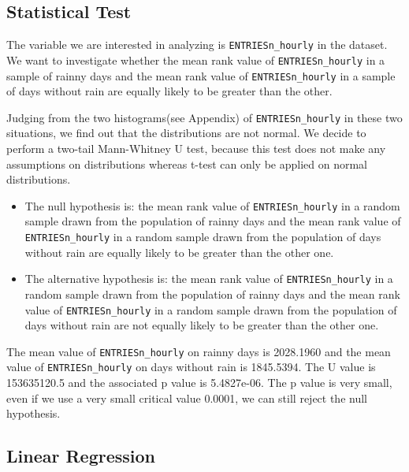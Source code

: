 \documentclass{article}
\begin{document}
    \subsection{Statistical Test}\label{statistical-test}

The variable we are interested in analyzing is \texttt{ENTRIESn\_hourly}
in the dataset. We want to investigate whether the mean rank value of
\texttt{ENTRIESn\_hourly} in a sample of rainny days and the mean rank
value of \texttt{ENTRIESn\_hourly} in a sample of days without rain are
equally likely to be greater than the other.

Judging from the two histograms(see Appendix) of
\texttt{ENTRIESn\_hourly} in these two situations, we find out that the
distributions are not normal. We decide to perform a two-tail
Mann-Whitney U test, because this test does not make any assumptions on
distributions whereas t-test can only be applied on normal
distributions.

\begin{itemize}
\itemsep1pt\parskip0pt
\item
  The null hypothesis is: the mean rank value of
  \texttt{ENTRIESn\_hourly} in a random sample drawn from the population
  of rainny days and the mean rank value of \texttt{ENTRIESn\_hourly} in
  a random sample drawn from the population of days without rain are
  equally likely to be greater than the other one.\\
\item
  The alternative hypothesis is: the mean rank value of
  \texttt{ENTRIESn\_hourly} in a random sample drawn from the population
  of rainny days and the mean rank value of \texttt{ENTRIESn\_hourly} in
  a random sample drawn from the population of days without rain are not
  equally likely to be greater than the other one.
\end{itemize}

The mean value of \texttt{ENTRIESn\_hourly} on rainny days is 2028.1960
and the mean value of \texttt{ENTRIESn\_hourly} on days without rain is
1845.5394. The U value is 153635120.5 and the associated p value is
5.4827e-06. The p value is very small, even if we use a very small
critical value 0.0001, we can still reject the null hypothesis.

    \subsection{Linear Regression}\label{linear-regression}
\end{document}
